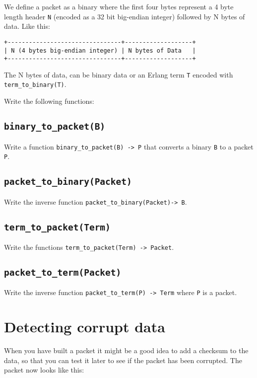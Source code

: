 ﻿\documentclass[12pt]{hitec}
\begin{document}
We define a packet as a binary where the first four bytes represent a
4 byte length header \verb+N+ (encoded as a 32 bit big-endian integer)
followed by N bytes of data. Like this:

\begin{verbatim}
+--------------------------------+-------------------+
| N (4 bytes big-endian integer) | N bytes of Data   |
+--------------------------------+-------------------+
\end{verbatim}


The N bytes of data, can be binary data or an Erlang term \verb+T+
encoded with \verb+term_to_binary(T)+.


Write the following functions:

\subsection{\texttt{binary\_to\_packet(B)}}

Write a function \verb+binary_to_packet(B) -> P+ that converts a
binary \verb+B+ to a packet \verb+P+.

\subsection{\texttt{packet\_to\_binary(Packet)}}
Write the inverse function \verb+packet_to_binary(Packet)-> B+.


\subsection{\texttt{term\_to\_packet(Term)}}
Write the functions \verb+term_to_packet(Term) -> Packet+.

\subsection{\texttt{packet\_to\_term(Packet)}}

Write the inverse
function \verb+packet_to_term(P) -> Term+ where \verb+P+ is a packet.

\section{Detecting corrupt data}

When you have built a packet it might be a good idea to add a checksum
to the data, so that you can test it later to see if the packet has
been corrupted. The packet now looks like this:
\end{document}
